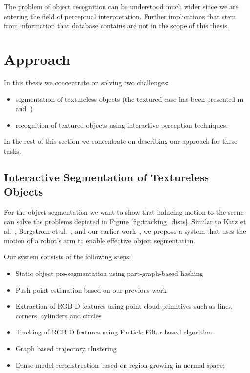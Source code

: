 The problem of object recognition can be understood much wider since we are entering the field of perceptual interpretation. Further implications that stem from information that database contains are not in the scope of this thesis.



\section{Approach} 

In this thesis we concentrate on solving two challenges: 

\begin{itemize} 
\item segmentation of textureless objects (the textured case has been presented in~\cite{bersch12interactive} and~\cite{Katz-WS-MM-ICRA2011})

\item recognition of textured objects using interactive perception techniques.
\end{itemize} 

In the rest of this section we concentrate on describing our approach for these tasks.

\subsection{Interactive Segmentation of Textureless Objects} 


For the object segmentation 
 we want to show that inducing motion to the scene can solve the problems depicted in Figure \ref{fig:tracking_dists}. Similar  to Katz  et al.~\cite{Katz-WS-MM-ICRA2011}, Bergstrom et
al.~\cite{bergstrom11icvs}, and our earlier
work~\cite{bersch12interactive}, we propose a system that uses the
motion of a robot's arm to enable effective
object  segmentation.

Our system consists of the following steps:

\begin{itemize} 
\item Static object pre-segmentation using part-graph-based hashing ~\cite{marton12SC}
\item Push point estimation based on our previous work ~\cite{bersch12interactive}
\item Extraction of RGB-D features using point cloud primitives such as lines, corners, cylinders and circles
\item Tracking of RGB-D features using Particle-Filter-based algorithm
\item Graph based trajectory clustering
\item Dense model reconstruction based on region growing in normal space;
\end{itemize} 


